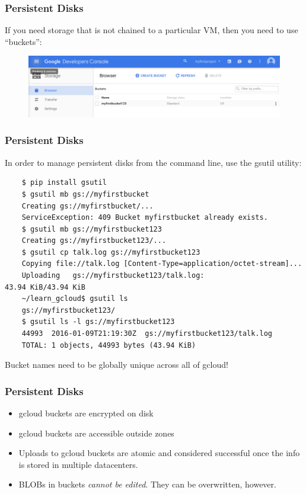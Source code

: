 \documentclass[9pt]{beamer}
\begin{document}
\begin{frame}[fragile]
  \frametitle{Persistent Disks}
  If you need storage that is not chained to a particular VM, then you need to use ``buckets'':
  \begin{figure}
    \includegraphics[scale=0.2]{figures/Buckets.png}
  \end{figure}
\end{frame}

\begin{frame}[fragile]
  \frametitle{Persistent Disks}
  In order to manage persistent disks from the command line, use the gsutil utility:
  \begin{verbatim}
    $ pip install gsutil
    $ gsutil mb gs://myfirstbucket
    Creating gs://myfirstbucket/...
    ServiceException: 409 Bucket myfirstbucket already exists.
    $ gsutil mb gs://myfirstbucket123
    Creating gs://myfirstbucket123/...
    $ gsutil cp talk.log gs://myfirstbucket123
    Copying file://talk.log [Content-Type=application/octet-stream]...
    Uploading   gs://myfirstbucket123/talk.log:                      43.94 KiB/43.94 KiB
    ~/learn_gcloud$ gsutil ls
    gs://myfirstbucket123/
    $ gsutil ls -l gs://myfirstbucket123
    44993  2016-01-09T21:19:30Z  gs://myfirstbucket123/talk.log
    TOTAL: 1 objects, 44993 bytes (43.94 KiB)
  \end{verbatim}
  Bucket names need to be globally unique across all of gcloud!
\end{frame}

\begin{frame}[fragile]
  \frametitle{Persistent Disks}
  \begin{itemize}
  \item gcloud buckets are encrypted on disk
  \item gcloud buckets are accessible outside zones
  \item Uploads to gcloud buckets are atomic and considered successful once the info is stored in multiple datacenters.
  \item BLOBs in buckets \emph{cannot be edited}. They can be overwritten, however.
  \end{itemize}
\end{frame}
\end{document}
